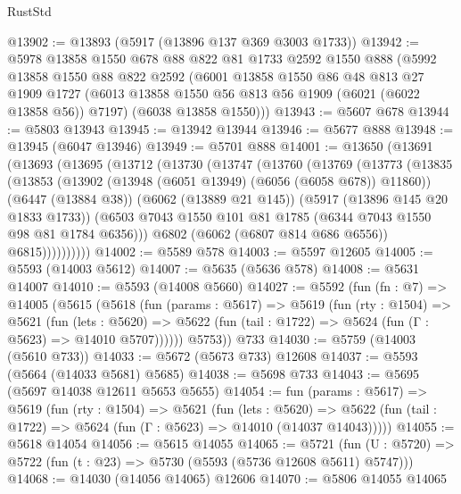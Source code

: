 \begin{lexlean}{RustStd}
\begin{coremodule}
@13902 := @13893 (@5917 (@13896 @137 @369 @3003 @1733))
@13942 := @5978
    @13858
    @1550
    @678
    @88
    @822
    @81
    @1733
    @2592
    @1550
    @888
    (@5992
      @13858
      @1550
      @88
      @822
      @2592
      (@6001
        @13858
        @1550
        @86
        @48
        @813
        @27
        @1909
        @1727
        (@6013 @13858 @1550 @56 @813 @56 @1909 (@6021 (@6022 @13858 @56)) @7197)
        (@6038 @13858 @1550)))
@13943 := @5607 @678
@13944 := @5803 @13943
@13945 := @13942 @13944
@13946 := @5677 @888
@13948 := @13945 (@6047 @13946)
@13949 := @5701 @888
@14001 := @13650
    (@13691
      (@13693
        (@13695
          (@13712
            (@13730
              (@13747
                (@13760
                  (@13769
                    (@13773
                      (@13835
                        (@13853
                          (@13902 (@13948 (@6051 @13949) (@6056 (@6058 @678)) @11860))
                          (@6447 (@13884 @38))
                          (@6062 (@13889 @21 @145))
                          (@5917 (@13896 @145 @20 @1833 @1733))
                          (@6503
                            @7043
                            @1550
                            @101
                            @81
                            @1785
                            (@6344 @7043 @1550 @98 @81 @1784 @6356)))
                        @6802
                        (@6062 (@6807 @814 @686 @6556))
                        @6815))))))))))
@14002 := @5589 @578
@14003 := @5597 @12605
@14005 := @5593 (@14003 @5612)
@14007 := @5635 (@5636 @578)
@14008 := @5631 @14007
@14010 := @5593 (@14008 @5660)
@14027 := @5592
    (fun (fn : @7) =>
    @14005
      (@5615
        (@5618
          (fun (params : @5617) =>
          @5619
            (fun (rty : @1504) =>
            @5621
              (fun (lets : @5620) =>
              @5622 (fun (tail : @1722) => @5624 (fun (Γ : @5623) => @14010 @5707))))))
        @5753))
    @733
@14030 := @5759 (@14003 (@5610 @733))
@14033 := @5672 (@5673 @733) @12608
@14037 := @5593 (@5664 (@14033 @5681) @5685)
@14038 := @5698 @733
@14043 := @5695 (@5697 @14038 @12611 @5653 @5655)
@14054 := fun (params : @5617) =>
  @5619
    (fun (rty : @1504) =>
    @5621
      (fun (lets : @5620) =>
      @5622 (fun (tail : @1722) => @5624 (fun (Γ : @5623) => @14010 (@14037 @14043)))))
@14055 := @5618 @14054
@14056 := @5615 @14055
@14065 := @5721
    (fun (U : @5720) => @5722 (fun (t : @23) => @5730 (@5593 (@5736 @12608 @5611) @5747)))
@14068 := @14030 (@14056 @14065) @12606
@14070 := @5806 @14055 @14065

\end{coremodule}
\end{lexlean}
